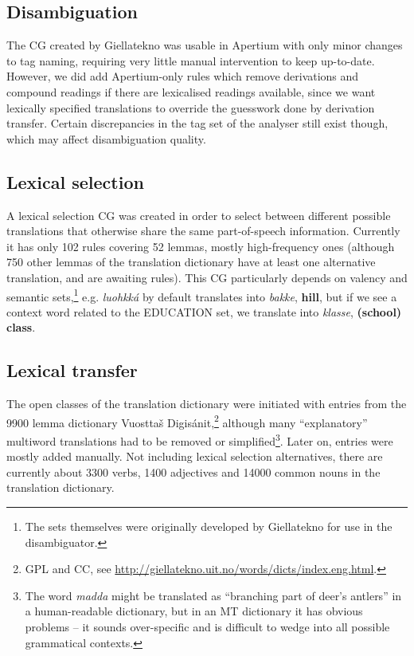 \documentclass{book}
\begin{document}
\subsection{Disambiguation}
The CG created by Giellatekno was usable in Apertium with only minor
changes to tag naming, requiring very little manual intervention to
keep up-to-date. However, we did add Apertium-only rules which remove
derivations and compound readings if there are lexicalised readings
available, since we want lexically specified translations to override
the guesswork done by derivation transfer. Certain discrepancies in
the tag set of the analyser still exist though, which may affect
disambiguation quality.

\subsection{Lexical selection}
A lexical selection CG was created in order to select between
different possible translations that otherwise share the same
part-of-speech information. Currently it has only 102 rules covering
52 lemmas, mostly high-frequency ones (although 750 other lemmas of
the translation dictionary have at least one alternative translation,
and are awaiting rules). This CG particularly depends on valency and
semantic sets,\footnote{The sets themselves were originally developed
  by Giellatekno for use in the disambiguator.} e.g.
\textit{luohkk\'{a}} by default translates into \textit{bakke},
\textbf{hill}, but if we see a context word related to the
\textsc{EDUCATION} set, we translate into \textit{klasse},
\textbf{(school) class}.


\subsection{Lexical transfer}
The open classes of the translation dictionary were initiated with
entries from the 9900 lemma dictionary Vuostta\v{s}
Digis\'{a}nit,\footnote{GPL and CC, see
  \href{http://giellatekno.uit.no/words/dicts/index.eng.html}{http://giellatekno.uit.no/words/dicts/index.eng.html}.}
although many ``explanatory'' multiword translations had to be removed
or simplified\footnote{The word \textit{madda} might be translated as
  ``branching part of deer's antlers'' in a human-readable dictionary,
  but in an MT dictionary it has obvious problems -- it sounds
  over-specific and is difficult to wedge into all possible
  grammatical contexts.}. Later on, entries were mostly added
manually. Not including lexical selection alternatives, there are
currently about 3300 verbs, 1400 adjectives and 14000 common nouns in
the translation dictionary.
\end{document}
